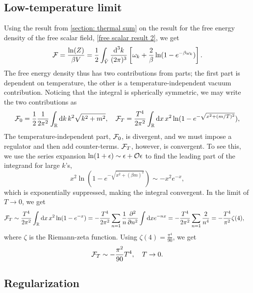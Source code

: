 \subsection{Low-temperature limit}

Using the result from \autoref{section: thermal sum} on the result for the free energy density of the free scalar field, \autoref{free scalar result 2}, we get
\begin{equation}
    \label{free scalar free enrgy}
    \mathcal{F} = \frac{\ln(Z)}{\beta V}
    = \frac{1}{2} \int_{\tilde V} \frac{\text{d}^3 k}{(2 \pi)^3}
    \left[
        \omega_k + \frac{2}{\beta }\ln(1 - e^{-\beta\omega_k})
    \right].
\end{equation}
The free energy density thus has two contributions from parts; the first part is dependent on temperature, the other is a temperature-independent vacuum contribution.
Noticing that the integral is spherically symmetric, we may write the two contributions as
\begin{equation}
    \mathcal{F}_0 = \frac{1}{2} \frac{1}{2 \pi^2}\int_{\mathbb{R}} \text{d} k \, k^2 \sqrt{k^2 + m^2}, \quad
    \mathcal{F}_T = \frac{T^4}{2 \pi^2}\int_{\mathbb{R}} \text{d} x \, x^2  \ln(1 - e^{-\sqrt{x^2 + (m/T)^2}}), 
\end{equation}
The temperature-independent part, $\mathcal{F}_0$, is divergent, and we must impose a regulator and then add counter-terms.
$\mathcal{F}_T$, however, is convergent. 
To see this, we use the series expansion $\ln(1 + \epsilon) \sim \epsilon + \mathcal O{\epsilon}$ to find the leading part of the integrand for large $k$'s, 
\begin{equation}
    x^2 \ln(1 - e^{-\sqrt{x^2 + (\beta m)^2}}) \sim - x^2 e^{-x}, 
\end{equation}
which is exponentially suppressed, making the integral convergent.
In the limit of $T \rightarrow 0$, we get
\begin{align}
    \nonumber
    \mathcal{F}_T & \sim 
    \frac{T^4}{2 \pi^2} \int_{\mathbb{R}} \text{d} x \, x^2 \ln(1 - e^{-x})
    = - \frac{T^4}{2 \pi^2} \sum_{n=1} \frac{1}{n} \pdv[2]{}{n} \int \text{d} x e^{-nx}
    = - \frac{T^4}{2 \pi^2} \sum_{n=1} \frac{2}{n^4}
    = - \frac{T^4}{\pi^2} \zeta(4),
\end{align}
where $\zeta$ is the Riemann-zeta function.
Using $\zeta(4) = \frac{\pi^4}{90}$, we get
\begin{equation}
    \mathcal{F}_T \sim - \frac{\pi^2}{90} T^4, \quad T \rightarrow 0.
\end{equation}

\subsection{Regularization}
\label{section: regualting free energy}


